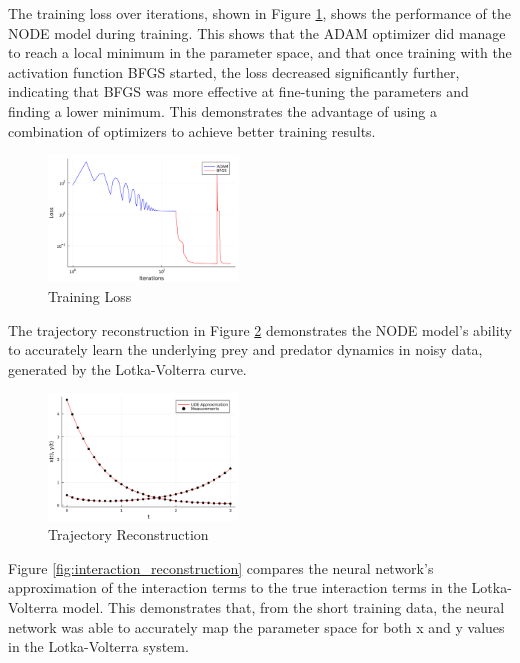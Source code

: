 \documentclass[twocolumn]{article}
\begin{document}
The training loss over iterations, shown in Figure \ref{fig:training_loss}, shows the performance of the NODE model during training. This shows that the ADAM optimizer did manage to reach a local minimum in the parameter space, and that once training with the activation function BFGS started, the loss decreased significantly further, indicating that BFGS was more effective at fine-tuning the parameters and finding a lower minimum. This demonstrates the advantage of using a combination of optimizers to achieve better training results.

\begin{figure}[h]
    \centering
    \includegraphics[width=0.45\textwidth]{plots/Ideal_Data__losses.pdf}
    \caption{Training Loss}
    \label{fig:training_loss}
\end{figure}

The trajectory reconstruction in Figure \ref{fig:trajectory_reconstruction} demonstrates the NODE model's ability to accurately learn the underlying prey and predator dynamics in noisy data, generated by the Lotka-Volterra curve.

\begin{figure}[h]
    \centering
    \includegraphics[width=0.45\textwidth]{plots/Ideal_Data__trajectory_reconstruction.pdf}
    \caption{Trajectory Reconstruction}
    \label{fig:trajectory_reconstruction}
\end{figure}

Figure \ref{fig:interaction_reconstruction} compares the neural network's approximation of the interaction terms to the true interaction terms in the Lotka-Volterra model. This demonstrates that, from the short training data, the neural network was able to accurately map the parameter space for both x and y values in the Lotka-Volterra system.
\end{document}
